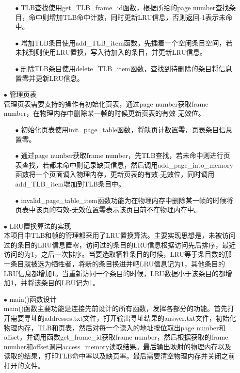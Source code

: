 \documentclass{article}
\begin{document}
\begin{itemize}
\begin{itemize}
\item[$\bullet$]TLB查找使用get\_TLB\_frame\_id函数，根据所给的page number查找条目，命中则增加TLB命中计数，同时更新LRU信息，否则返回-1表示未命中。
\item[$\bullet$]增加TLB条目使用add\_TLB\_item函数，先插着一个空闲条目空间，若未找到则使用LRU置换，写入待加入的条目，并更新LRU信息。
\item[$\bullet$]删除TLB条目使用delete\_TLB\_item函数，查找到待删除的条目将信息置零并更新LRU信息。
\end{itemize}
\item[$\bullet$]管理页表\\
管理页表需要支持的操作有初始化页表，通过page number获取frame number，在物理内存中删除某一帧的时候更新页表的有效-无效位。
\begin{itemize}
\item[$\bullet$]初始化页表使用init\_page\_table函数，将缺页计数置零，页表条目信息置零。
\item[$\bullet$]通过page number获取frame number，先TLB查找，若未命中则进行页表查找，若都未命中则记录缺页信息，然后调用add\_page\_into\_memory函数将一个页面调入物理内存，更新页表的有效-无效位，同时调用add\_TLB\_item增加到TLB条目中。
\item[$\bullet$]invalid\_page\_table\_item函数功能为在物理内存中删除某一帧的时候将页表中该页的有效-无效位置零表示该页目前不在物理内存中。
\end{itemize}
\item[$\bullet$]LRU置换算法的实现\\
本项目中TLB和帧的管理都采用了LRU置换算法。主要实现思想是，未被访问过的条目的LRU信息置零，访问过的条目的LRU信息根据访问先后排序，最近访问的为1，之后一次排序。当要选取牺牲条目的时候，LRU等于条目数的那一条目就被选为牺牲者，将新的条目换进并吧LRU信息记为1，其他条目的LRU信息都增加1。当重新访问一个条目的时候，LRU数据小于该条目的都增加1，并将该条目的LRU记为1。
\item[$\bullet$]main()函数设计\\
main()函数主要功能是连接先前设计的所有函数，发挥各部分的功能。首先打开需要寻址的addresses.txt文件，打开输出寻址结果的answer.txt文件，初始化物理内存，TLB和页表，然后对每一个读入的地址按位取出page number和offset，并调用函数get\_frame\_id获取frame number，然后根据获取的frame number和offset调用access\_memory读取结果。最后输出映射的物理内存以及读取的结果，打印TLB命中率以及缺页率。最后需要清空物理内存并关闭之前打开的文件。
\end{itemize}
\end{document}
